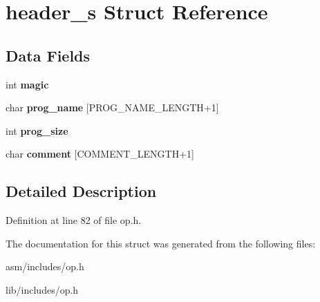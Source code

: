\hypertarget{structheader__s}{\section{header\-\_\-s Struct Reference}
\label{structheader__s}
}
\subsection*{Data Fields}
\begin{DoxyCompactItemize}
\item 
\hypertarget{structheader__s_a6480f97b5704e0c84200f69c08d46870}{int {\bfseries magic}}\label{structheader__s_a6480f97b5704e0c84200f69c08d46870}

\item 
\hypertarget{structheader__s_a6c90521fe7894d9c9a4c741ec7277bf3}{char {\bfseries prog\-\_\-name} \mbox{[}P\-R\-O\-G\-\_\-\-N\-A\-M\-E\-\_\-\-L\-E\-N\-G\-T\-H+1\mbox{]}}\label{structheader__s_a6c90521fe7894d9c9a4c741ec7277bf3}

\item 
\hypertarget{structheader__s_ad2581b30c4292bde684ada555e8c23ce}{int {\bfseries prog\-\_\-size}}\label{structheader__s_ad2581b30c4292bde684ada555e8c23ce}

\item 
\hypertarget{structheader__s_a6370f31717936d9563447f77aced5d63}{char {\bfseries comment} \mbox{[}C\-O\-M\-M\-E\-N\-T\-\_\-\-L\-E\-N\-G\-T\-H+1\mbox{]}}\label{structheader__s_a6370f31717936d9563447f77aced5d63}

\end{DoxyCompactItemize}


\subsection{Detailed Description}


Definition at line 82 of file op.\-h.



The documentation for this struct was generated from the following files\-:\begin{DoxyCompactItemize}
\item 
asm/includes/op.\-h\item 
lib/includes/op.\-h\end{DoxyCompactItemize}
